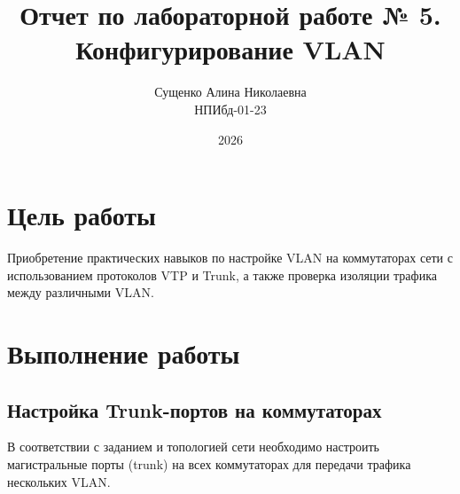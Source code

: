 

\title{Отчет по лабораторной работе № 5. \\ Конфигурирование VLAN}
\author{Сущенко Алина Николаевна \\ НПИбд-01-23}
\date{2026}



\maketitle
\newpage

\tableofcontents

\newpage
\section{Цель работы}
Приобретение практических навыков по настройке VLAN на коммутаторах сети с использованием протоколов VTP и Trunk, а также проверка изоляции трафика между различными VLAN.

\newpage
\section{Выполнение работы}

\subsection{Настройка Trunk-портов на коммутаторах}
В соответствии с заданием и топологией сети необходимо настроить магистральные порты (trunk) на всех коммутаторах для передачи трафика нескольких VLAN.

